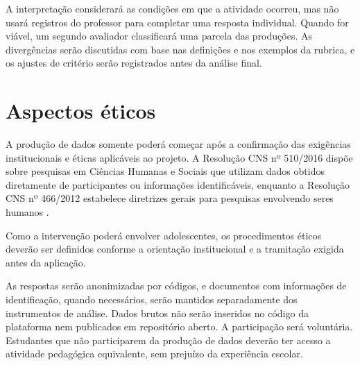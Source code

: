 A interpretação considerará as condições em que a atividade ocorreu, mas não usará registros do professor para completar uma resposta individual. Quando for viável, um segundo avaliador classificará uma parcela das produções. As divergências serão discutidas com base nas definições e nos exemplos da rubrica, e os ajustes de critério serão registrados antes da análise final.

\section{Aspectos éticos}

A produção de dados somente poderá começar após a confirmação das exigências institucionais e éticas aplicáveis ao projeto. A Resolução CNS nº 510/2016 dispõe sobre pesquisas em Ciências Humanas e Sociais que utilizam dados obtidos diretamente de participantes ou informações identificáveis, enquanto a Resolução CNS nº 466/2012 estabelece diretrizes gerais para pesquisas envolvendo seres humanos \cite{brasil2016cns510,brasil2012cns466}.

Como a intervenção poderá envolver adolescentes, os procedimentos éticos deverão ser definidos conforme a orientação institucional e a tramitação exigida antes da aplicação.

As respostas serão anonimizadas por códigos, e documentos com informações de identificação, quando necessários, serão mantidos separadamente dos instrumentos de análise. Dados brutos não serão inseridos no código da plataforma nem publicados em repositório aberto. A participação será voluntária. Estudantes que não participarem da produção de dados deverão ter acesso a atividade pedagógica equivalente, sem prejuízo da experiência escolar.
